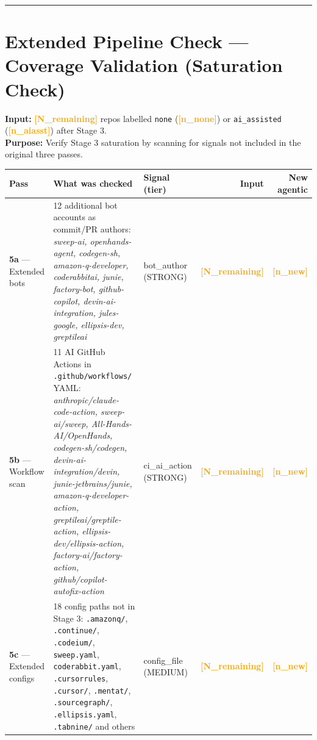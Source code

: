 \documentclass[10pt,a4paper]{article}
\newcommand{\FILLIN}[1]{\textcolor{orange}{\textbf{[#1]}}}
\begin{document}
\vspace{6pt}
\hrule
\vspace{6pt}

\newpage
\section*{Extended Pipeline Check --- Coverage Validation (Saturation Check)}

\textbf{Input:} \FILLIN{N\_remaining} repos labelled \texttt{none} (\FILLIN{n\_none}) or
\texttt{ai\_assisted} (\FILLIN{n\_aiasst}) after Stage 3.\\
\textbf{Purpose:} Verify Stage 3 saturation by scanning for signals not included in the
original three passes.

\vspace{4pt}
\begin{tabular}{@{}p{2.2cm} p{5.8cm} p{2.4cm} r r@{}}
\toprule
\textbf{Pass} & \textbf{What was checked} & \textbf{Signal (tier)} & \textbf{Input} & \textbf{New agentic} \\
\midrule
\textbf{5a} --- Extended bots &
  12 additional bot accounts as commit/PR authors:
  \textit{sweep-ai, openhands-agent, codegen-sh, amazon-q-developer,
  coderabbitai, junie, factory-bot, github-copilot,
  devin-ai-integration, jules-google, ellipsis-dev, greptileai} &
  bot\_author (STRONG) & \FILLIN{N\_remaining} & \textbf{\FILLIN{n\_new}} \\[6pt]
\textbf{5b} --- Workflow scan &
  11 AI GitHub Actions in \texttt{.github/workflows/} YAML:
  \textit{anthropic/claude-code-action, sweep-ai/sweep,
  All-Hands-AI/OpenHands, codegen-sh/codegen,
  devin-ai-integration/devin, junie-jetbrains/junie,
  amazon-q-developer-action, greptileai/greptile-action,
  ellipsis-dev/ellipsis-action, factory-ai/factory-action,
  github/copilot-autofix-action} &
  ci\_ai\_action (STRONG) & \FILLIN{N\_remaining} & \textbf{\FILLIN{n\_new}} \\[6pt]
\textbf{5c} --- Extended configs &
  18 config paths not in Stage 3:
  \texttt{.amazonq/}, \texttt{.continue/}, \texttt{.codeium/},
  \texttt{sweep.yaml}, \texttt{coderabbit.yaml}, \texttt{.cursorrules},
  \texttt{.cursor/}, \texttt{.mentat/}, \texttt{.sourcegraph/},
  \texttt{.ellipsis.yaml}, \texttt{.tabnine/} and others &
  config\_file (MEDIUM) & \FILLIN{N\_remaining} & \textbf{\FILLIN{n\_new}} \\
\bottomrule
\end{tabular}
\end{document}
